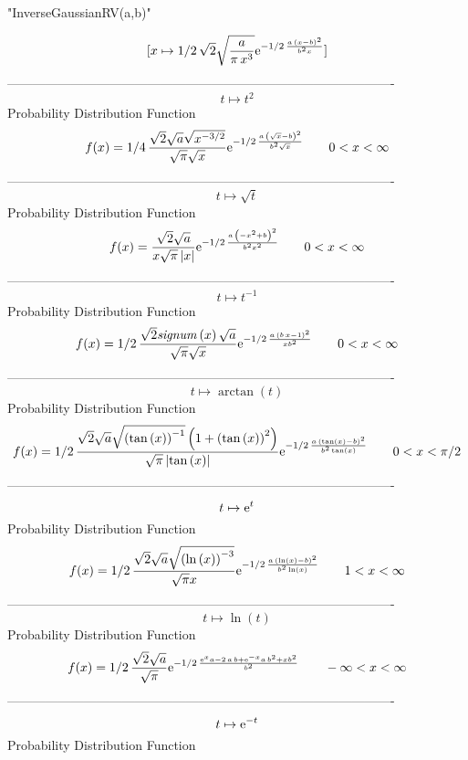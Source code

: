 \documentclass[12pt]{article}
\begin{document}
 
                          "InverseGaussianRV(a,b)"

$$[x\mapsto 1/2\,\sqrt {2}\sqrt {{\frac {a}{\pi\,{x}^{3}}}}{{\rm e}^{-1/
2\,{\frac {a\, \left( x-b \right) ^{2}}{{b}^{2}x}}}}]
$$-------------------------------------------------------------------------------------------  \\$$t\mapsto {t}^{2}
$$Probability Distribution Function 
$$  f(x)=1/4\,{\frac {\sqrt {2}\sqrt {a}\sqrt {{x}^{-3/2}}}{\sqrt {\pi}\sqrt {x
}}{{\rm e}^{-1/2\,{\frac {a\, \left( \sqrt {x}-b \right) ^{2}}{{b}^{2}
\sqrt {x}}}}}}
 \qquad0
 < x < \infty 
$$-------------------------------------------------------------------------------------------  \\$$t\mapsto \sqrt {t}
$$Probability Distribution Function 
$$  f(x)={\frac {\sqrt {2}\sqrt {a}}{x\sqrt {\pi} \left| x \right| }{{\rm e}^{-
1/2\,{\frac {a\, \left( -{x}^{2}+b \right) ^{2}}{{b}^{2}{x}^{2}}}}}}
 \qquad0
 < x < \infty 
$$-------------------------------------------------------------------------------------------  \\$$t\mapsto {t}^{-1}
$$Probability Distribution Function 
$$  f(x)=1/2\,{\frac {\sqrt {2}{\it signum} \left( x \right) \sqrt {a}}{\sqrt {
\pi}\sqrt {x}}{{\rm e}^{-1/2\,{\frac {a\, \left( b\,x-1 \right) ^{2}}{
x{b}^{2}}}}}}
 \qquad0
 < x < \infty 
$$-------------------------------------------------------------------------------------------  \\$$t\mapsto \arctan \left( t \right) 
$$Probability Distribution Function 
$$  f(x)=1/2\,{\frac {\sqrt {2}\sqrt {a}\sqrt { \left( \tan \left( x \right) 
 \right) ^{-1}} \left( 1+ \left( \tan \left( x \right)  \right) ^{2}
 \right) }{\sqrt {\pi} \left| \tan \left( x \right)  \right| }{{\rm e}
^{-1/2\,{\frac {a\, \left( \tan \left( x \right) -b \right) ^{2}}{{b}^
{2}\tan \left( x \right) }}}}}
 \qquad0
 < x < \pi/2
$$-------------------------------------------------------------------------------------------  \\$$t\mapsto {{\rm e}^{t}}
$$Probability Distribution Function 
$$  f(x)=1/2\,{\frac {\sqrt {2}\sqrt {a}\sqrt { \left( \ln  \left( x \right) 
 \right) ^{-3}}}{\sqrt {\pi}x}{{\rm e}^{-1/2\,{\frac {a\, \left( \ln 
 \left( x \right) -b \right) ^{2}}{{b}^{2}\ln  \left( x \right) }}}}}
 \qquad1
 < x < \infty 
$$-------------------------------------------------------------------------------------------  \\$$t\mapsto \ln  \left( t \right) 
$$Probability Distribution Function 
$$  f(x)=1/2\,{\frac {\sqrt {2}\sqrt {a}}{\sqrt {\pi}}{{\rm e}^{-1/2\,{\frac {{
{\rm e}^{x}}a-2\,a\,b+{{\rm e}^{-x}}a\,{b}^{2}+x{b}^{2}}{{b}^{2}}}}}}
 \qquad-\infty 
 < x < \infty 
$$-------------------------------------------------------------------------------------------  \\$$t\mapsto {{\rm e}^{-t}}
$$Probability Distribution Function 
\end{document}
